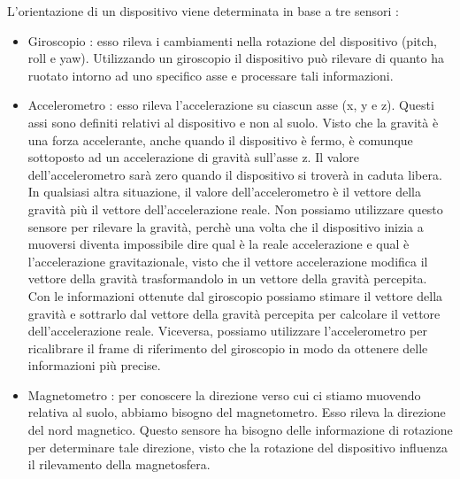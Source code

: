 \documentclass[12pt]{report}
\begin{document}
L'orientazione di un dispositivo viene determinata in base a tre sensori :
\begin{itemize}
\item Giroscopio : esso rileva i cambiamenti nella rotazione del dispositivo (pitch, roll e yaw). Utilizzando un giroscopio il dispositivo può rilevare di quanto ha ruotato intorno ad uno specifico asse e processare tali informazioni.
\item Accelerometro : esso rileva l'accelerazione su ciascun asse (x, y e z). Questi assi sono definiti relativi al dispositivo e non al suolo. Visto che la gravità è una forza accelerante, anche quando il dispositivo è fermo, è comunque sottoposto ad un accelerazione di gravità sull'asse z. Il valore dell'accelerometro sarà zero quando il dispositivo si troverà in caduta libera. In qualsiasi altra situazione, il valore dell'accelerometro è il vettore della gravità più il vettore dell'accelerazione reale. Non possiamo utilizzare questo sensore per rilevare la gravità, perchè una volta che il dispositivo inizia a muoversi diventa impossibile dire qual è la reale accelerazione e qual è l'accelerazione gravitazionale, visto che il vettore accelerazione modifica il vettore della gravità trasformandolo in un vettore della gravità percepita. Con le informazioni ottenute dal giroscopio possiamo stimare il vettore della gravità e sottrarlo dal vettore della gravità percepita per calcolare il vettore dell'accelerazione reale. Viceversa, possiamo utilizzare l'accelerometro per ricalibrare il frame di riferimento del giroscopio in modo da ottenere delle informazioni più precise.
\item Magnetometro : per conoscere la direzione verso cui ci stiamo muovendo relativa al suolo, abbiamo bisogno del magnetometro. Esso rileva la direzione del nord magnetico. Questo sensore ha bisogno delle informazione di rotazione per determinare tale direzione, visto che la rotazione del dispositivo influenza il rilevamento della magnetosfera.
\end{itemize}
\end{document}
